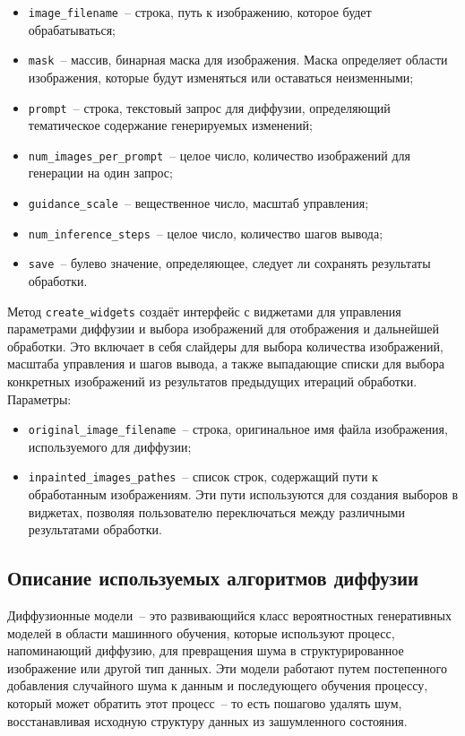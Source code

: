 \begin{itemize}
    \item \lstinline{image_filename}~-- строка, путь к изображению, которое будет обрабатываться;
    \item \lstinline{mask}~-- массив, бинарная маска для изображения. Маска определяет области изображения, которые будут изменяться или оставаться неизменными;
    \item \lstinline{prompt}~-- строка, текстовый запрос для диффузии, определяющий тематическое содержание генерируемых изменений;
    \item \lstinline{num_images_per_prompt}~-- целое число, количество изображений для генерации на один запрос;
    \item \lstinline{guidance_scale}~-- вещественное число, масштаб управления;
    \item \lstinline{num_inference_steps}~-- целое число, количество шагов вывода;
    \item \lstinline{save}~-- булево значение, определяющее, следует ли сохранять результаты обработки.
\end{itemize}

Метод \lstinline{create_widgets} создаёт интерфейс с виджетами для управления параметрами диффузии и выбора изображений для отображения и дальнейшей обработки. Это включает в себя слайдеры для выбора количества изображений, масштаба управления и шагов вывода, а также выпадающие списки для выбора конкретных изображений из результатов предыдущих итераций обработки. Параметры:

\begin{itemize}
    \item \lstinline{original_image_filename}~-- строка, оригинальное имя файла изображения, используемого для диффузии;
    \item \lstinline{inpainted_images_pathes}~-- список строк, содержащий пути к обработанным изображениям. Эти пути используются для создания выборов в виджетах, позволяя пользователю переключаться между различными результатами обработки.
\end{itemize}

\subsection{Описание используемых алгоритмов диффузии}

Диффузионные модели~-- это развивающийся класс вероятностных генеративных моделей в области машинного обучения, которые используют процесс, напоминающий диффузию, для превращения шума в структурированное изображение или другой тип данных. Эти модели работают путем постепенного добавления случайного шума к данным и последующего обучения процессу, который может обратить этот процесс~-- то есть пошагово удалять шум, восстанавливая исходную структуру данных из зашумленного состояния.

